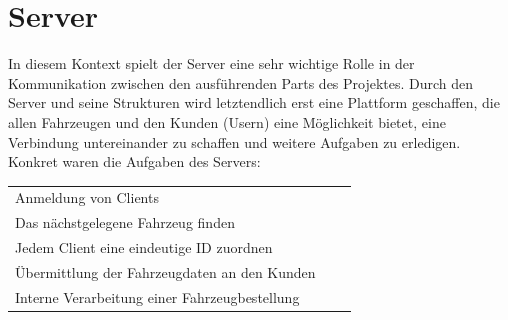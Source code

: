 \section{Server}
In diesem Kontext spielt der Server eine sehr wichtige Rolle in der Kommunikation zwischen den ausführenden Parts des Projektes. Durch den Server und seine Strukturen wird letztendlich erst eine Plattform geschaffen, die allen Fahrzeugen und den Kunden (Usern) eine Möglichkeit bietet, eine Verbindung untereinander zu schaffen und weitere Aufgaben zu erledigen. Konkret waren die Aufgaben des Servers:
\begin{table}[h]
\begin{tabular}{lcr}
Anmeldung von Clients\\
Das nächstgelegene Fahrzeug finden\\
Jedem Client eine eindeutige ID zuordnen\\
Übermittlung der Fahrzeugdaten an den Kunden\\
Interne Verarbeitung einer Fahrzeugbestellung\\
\end{tabular}
\end{table}
